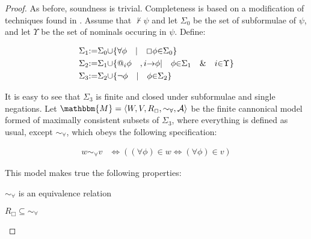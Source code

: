 \begin{proof}
  As before, soundness is trivial.  Completeness is based on a modification
  of techniques found in {\cite[chapter 5]{boolos_logic_1995}}.  Assume
  that $\nvdash \psi$ and let $\Sigma_0$ be the set of subformulae of $\psi$,
  and let $\Upsilon$ be the set of nominals occuring in $\psi$.  Define:
  
  \begin{align*}
    {\Sigma}_1 &
    {:=}{\Sigma}_0{\cup}\{{\forall}{\phi}{\hspace{1em}}|{\hspace{1em}}\Box{\phi}{\in}{\Sigma}_0\}\\
    {\Sigma}_2 &
    {:=}{\Sigma}_1{\cup}\{\text{@}_i{\phi}{\hspace{1em}},i{\rightarrow}{\phi}|{\hspace{1em}}{\phi}{\in}{\Sigma}_1{\hspace{1em}}\&{\hspace{1em}}i{\in}{\Upsilon}\}\\
    {\Sigma}_3 &
    {:=}{\Sigma}_2{\cup}\{{\neg}{\phi}{\hspace{1em}}|{\hspace{1em}}{\phi}{\in}{\Sigma}_2\}
  \end{align*}
  
  It is easy to see that $\Sigma_3$ is finite and closed under subformulae and
  single negations. Let $\mathbbm{M}= \langle W, V, R_{\Box}, \sim_{\forall},
  \mathcal{A} \rangle$ be the finite cannonical model formed of maximally
  consistent subsets of $\Sigma_3$, where everything is defined as usual,
  except $\sim_{\forall}$, which obeys the following specification:
  
  \begin{align*}
    w {\sim}_{{\forall}}v & {\Longleftrightarrow}(({\forall}{\phi}){\in}w
    {\Longleftrightarrow}({\forall}{\phi}){\in}v)
  \end{align*}
  
  This model makes true the following properties:
  \begin{enumerateroman}
    \item $\sim_{\forall}$ is an equivalence relation
    
    \item $R_{\Box} \subseteq \sim_{\forall}$
    

\end{enumerateroman}
\end{proof}
